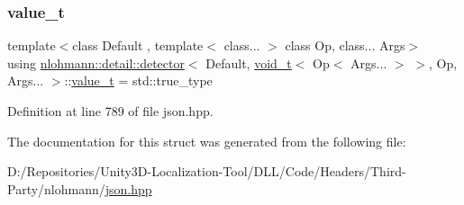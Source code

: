 \subsubsection{\texorpdfstring{value\_t}{value\_t}}
{\footnotesize\ttfamily template$<$class Default , template$<$ class... $>$ class Op, class... Args$>$ \\
using \mbox{\hyperlink{structnlohmann_1_1detail_1_1detector}{nlohmann\+::detail\+::detector}}$<$ Default, \mbox{\hyperlink{namespacenlohmann_1_1detail_a92a167c49c6697b6ffe4f79492c705e5}{void\+\_\+t}}$<$ Op$<$ Args... $>$ $>$, Op, Args... $>$\+::\mbox{\hyperlink{structnlohmann_1_1detail_1_1detector_3_01_default_00_01void__t_3_01_op_3_01_args_8_8_8_01_4_01_4_00_01_op_00_01_args_8_8_8_01_4_ab748f9f00bb31bee4978a033589f8c85}{value\+\_\+t}} =  std\+::true\+\_\+type}



Definition at line 789 of file json.\+hpp.



The documentation for this struct was generated from the following file\+:\begin{DoxyCompactItemize}
\item 
D\+:/\+Repositories/\+Unity3\+D-\/\+Localization-\/\+Tool/\+D\+L\+L/\+Code/\+Headers/\+Third-\/\+Party/nlohmann/\mbox{\hyperlink{json_8hpp}{json.\+hpp}}\end{DoxyCompactItemize}
